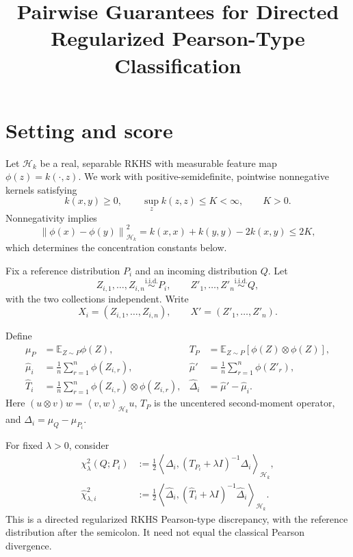 \documentclass[11pt,a4paper]{article}
\title{Pairwise Guarantees for Directed\\
Regularized Pearson-Type Classification}
\author{}
\date{}
\newcommand{\HH}{\mathcal H_k}
\newcommand{\E}{\mathbb E}
\newcommand{\norm}[1]{\left\lVert #1\right\rVert}
\newcommand{\inner}[2]{\left\langle #1,#2\right\rangle}
\begin{document}
\maketitle

\section{Setting and score}

Let $\HH$ be a real, separable RKHS with measurable
feature map $\phi(z)=k(\cdot,z)$. We work with
positive-semidefinite, pointwise nonnegative kernels
satisfying
\begin{equation}\label{eq:kernel}
    k(x,y)\ge0,
    \qquad
    \sup_z k(z,z)\le K<\infty,
    \qquad K>0.
\end{equation}
Nonnegativity implies
\begin{equation}\label{eq:feature-difference}
    \norm{\phi(x)-\phi(y)}_{\HH}^2
    =k(x,x)+k(y,y)-2k(x,y)\le2K,
\end{equation}
which determines the concentration constants below.

Fix a reference distribution $P_i$ and an incoming
distribution $Q$. Let
\[
    Z_{i,1},\ldots,Z_{i,n}
    \overset{\mathrm{i.i.d.}}{\sim}P_i,
    \qquad
    Z'_1,\ldots,Z'_n
    \overset{\mathrm{i.i.d.}}{\sim}Q,
\]
with the two collections independent. Write
\[
    X_i=(Z_{i,1},\ldots,Z_{i,n}),
    \qquad
    X'=(Z'_1,\ldots,Z'_n).
\]

Define
\begin{align*}
    \mu_P&=\E_{Z\sim P}\phi(Z),
    &
    T_P&=\E_{Z\sim P}[\phi(Z)\otimes\phi(Z)],\\
    \widehat\mu_i&=\frac1n\sum_{r=1}^n\phi(Z_{i,r}),
    &
    \widehat\mu'&=\frac1n\sum_{r=1}^n\phi(Z'_r),\\
    \widehat T_i&=\frac1n\sum_{r=1}^n
        \phi(Z_{i,r})\otimes\phi(Z_{i,r}),
    &
    \widehat\Delta_i&=\widehat\mu'-\widehat\mu_i.
\end{align*}
Here $(u\otimes v)w=\inner{v}{w}_{\HH}u$,
$T_P$ is the uncentered second-moment operator,
and $\Delta_i=\mu_Q-\mu_{P_i}$.

For fixed $\lambda>0$, consider
\begin{align}
    \chi^2_\lambda(Q;P_i)
    &:=
    \frac12\inner{\Delta_i}
    {(T_{P_i}+\lambda I)^{-1}\Delta_i}_{\HH},
    \label{eq:population}\\
    \widehat\chi^2_{\lambda,i}
    &:=
    \frac12\inner{\widehat\Delta_i}
    {(\widehat T_i+\lambda I)^{-1}
    \widehat\Delta_i}_{\HH}.
    \label{eq:empirical}
\end{align}
This is a directed regularized RKHS Pearson-type
discrepancy, with the reference distribution after
the semicolon. It need not equal the classical
Pearson divergence.
\end{document}
